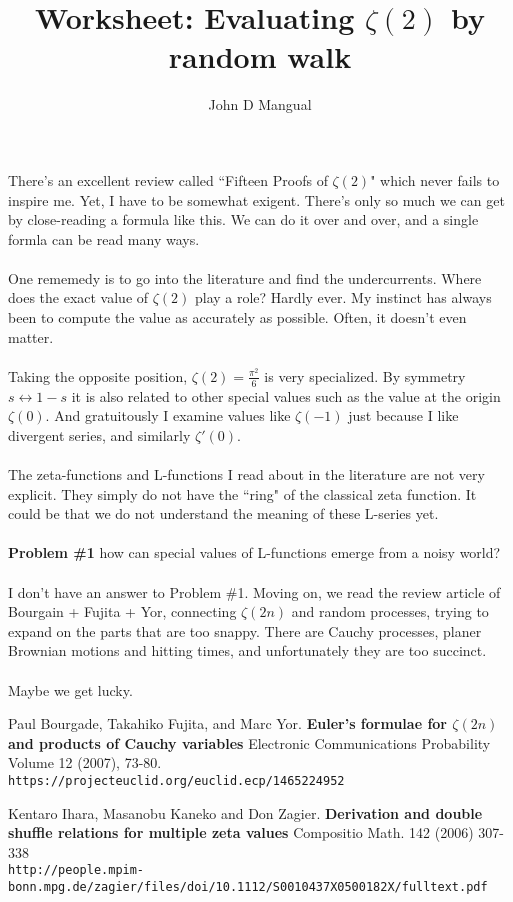 \documentclass[12pt]{article}
\title{Worksheet: Evaluating $\zeta(2)$ by random walk}
\author{John D Mangual}
\date{}
\begin{document}
\selectfont \fontsize{12.5}{15}\selectfont

\maketitle

\noindent There's an excellent review called ``Fifteen Proofs of $\zeta(2)$" which never fails to inspire me. Yet, I have to be somewhat exigent.  There's only so much we can get by close-reading a formula like this.  We can do it over and over, and a single formla can be read many ways.  \\ \\
One rememedy is to go into the literature and find the undercurrents.  Where does the exact value of $\zeta(2)$ play a role?  Hardly ever. My instinct has always been to compute the value as accurately as possible.  Often, it doesn't even matter. \\ \\
Taking the opposite position, $\zeta(2) = \frac{\pi^2}{6}$ is  very specialized.  By symmetry $s \leftrightarrow 1 - s$ it is also related to other special values such as the value at the origin $\zeta(0)$.   And gratuitously I examine values like $\zeta(-1)$ just because I like divergent series, and similarly $\zeta'(0)$. \\ \\
The zeta-functions and L-functions I read about in the literature are not very explicit.  They simply do not have the ``ring" of the classical zeta function.  It could be that we do not understand the meaning of these L-series yet.  \\ \\
\textbf{Problem \#1} how can special values of L-functions emerge from a noisy world? \\ \\
I don't have an answer to Problem \#1.  Moving on, we read the review article of Bourgain + Fujita + Yor, connecting $\zeta(2n)$ and random processes, trying to expand on the parts that are too snappy.  There are Cauchy processes, planer Brownian motions and hitting times, and unfortunately they are too succinct. \\ \\
Maybe we get lucky.
 
\vfill

\begin{thebibliography}{}

\item Paul Bourgade, Takahiko Fujita, and Marc Yor. \textbf{Euler's formulae for $\zeta(2n)$ and products of Cauchy variables} Electronic Communications Probability
Volume 12 (2007), 73-80. \\
\texttt{https://projecteuclid.org/euclid.ecp/1465224952}

\item Kentaro Ihara, Masanobu Kaneko and Don Zagier. \textbf{Derivation and double shuffle relations
for multiple zeta values} Compositio Math. 142 (2006) 307-338 \\ 
\texttt{http://people.mpim-bonn.mpg.de/zagier/files/doi/10.1112/S0010437X0500182X/fulltext.pdf}

\end{thebibliography}
\end{document}

